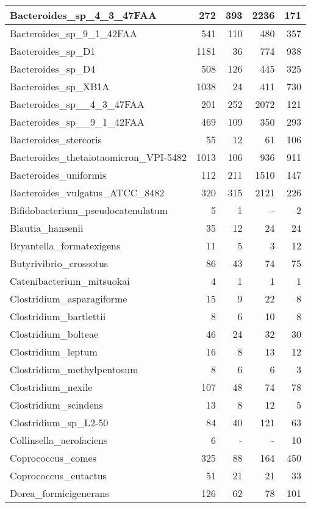 \documentclass[12pt,a4paper]{article}
\begin{document}
\begin{table}[ht]
\begin{center}
\begin{tabular}{|l*{4}{|r}|}
Bacteroides\_sp\_4\_3\_47FAA & 272 & 393 & 2236 & 171 \\ \hline
Bacteroides\_sp\_9\_1\_42FAA & 541 & 110 & 480 & 357 \\ \hline
Bacteroides\_sp\_D1 & 1181 & 36 & 774 & 938 \\ \hline
Bacteroides\_sp\_D4 & 508 & 126 & 445 & 325 \\ \hline
Bacteroides\_sp\_XB1A & 1038 & 24 & 411 & 730 \\ \hline
Bacteroides\_sp\_\_4\_3\_47FAA & 201 & 252 & 2072 & 121 \\ \hline
Bacteroides\_sp\_\_9\_1\_42FAA & 469 & 109 & 350 & 293 \\ \hline
Bacteroides\_stercoris & 55 & 12 & 61 & 106 \\ \hline
Bacteroides\_thetaiotaomicron\_VPI-5482 & 1013 & 106 & 936 & 911 \\ \hline
Bacteroides\_uniformis & 112 & 211 & 1510 & 147 \\ \hline
Bacteroides\_vulgatus\_ATCC\_8482 & 320 & 315 & 2121 & 226 \\ \hline
Bifidobacterium\_pseudocatenulatum & 5 & 1 & - & 2 \\ \hline
Blautia\_hansenii & 35 & 12 & 24 & 24 \\ \hline
Bryantella\_formatexigens & 11 & 5 & 3 & 12 \\ \hline
Butyrivibrio\_crossotus & 86 & 43 & 74 & 75 \\ \hline
Catenibacterium\_mitsuokai & 4 & 1 & 1 & 1 \\ \hline
Clostridium\_asparagiforme & 15 & 9 & 22 & 8 \\ \hline
Clostridium\_bartlettii & 8 & 6 & 10 & 8 \\ \hline
Clostridium\_bolteae & 46 & 24 & 32 & 30 \\ \hline
Clostridium\_leptum & 16 & 8 & 13 & 12 \\ \hline
Clostridium\_methylpentosum & 8 & 6 & 6 & 3 \\ \hline
Clostridium\_nexile & 107 & 48 & 74 & 78 \\ \hline
Clostridium\_scindens & 13 & 8 & 12 & 5 \\ \hline
Clostridium\_sp\_L2-50 & 84 & 40 & 121 & 63 \\ \hline
Collinsella\_aerofaciens & 6 & - & - & 10 \\ \hline
Coprococcus\_comes & 325 & 88 & 164 & 450 \\ \hline
Coprococcus\_eutactus & 51 & 21 & 21 & 33 \\ \hline
Dorea\_formicigenerans & 126 & 62 & 78 & 101 \\ \hline

\end{tabular}
\end{center}
\end{table}
\end{document}
